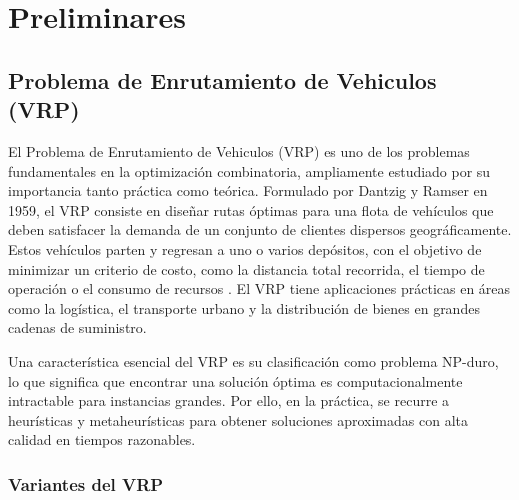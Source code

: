 \documentclass{article}
\begin{document}
\section{Preliminares}
\subsection{Problema de Enrutamiento de Vehiculos (VRP)}
El Problema de Enrutamiento de Vehiculos (VRP) es uno de los problemas fundamentales en la optimización combinatoria, ampliamente estudiado por su importancia tanto práctica como teórica. Formulado por Dantzig y Ramser en 1959, el VRP consiste en diseñar rutas óptimas para una flota de vehículos que deben satisfacer la demanda de un conjunto de clientes dispersos geográficamente.\cite{ref2} Estos vehículos parten y regresan a uno o varios depósitos, con el objetivo de minimizar un criterio de costo, como la distancia total recorrida, el tiempo de operación o el consumo de recursos \cite{ref3}. El VRP tiene aplicaciones prácticas en áreas como la logística, el transporte urbano y la distribución de bienes en grandes cadenas de suministro.\cite{ref8,ref10,ref11}

Una característica esencial del VRP es su clasificación como problema NP-duro, lo que significa que encontrar una solución óptima es computacionalmente intractable para instancias grandes. Por ello, en la práctica, se recurre a heurísticas y metaheurísticas para obtener soluciones aproximadas con alta calidad en tiempos razonables.\cite{ref7}

\subsubsection{Variantes del VRP}
\end{document}
